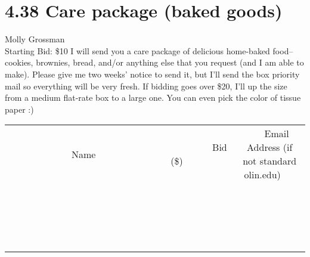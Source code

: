 \documentclass[11pt]{article}
\begin{document}
\section*{4.38 Care package (baked goods)}
Molly Grossman
\\
Starting Bid: \$10
\newline
I will send you a care package of delicious home-baked food--cookies, brownies, bread, and/or anything else that you request (and I am able to make). Please give me two weeks' notice to send it, but I'll send the box priority mail so everything will be very fresh. If bidding goes over \$20, I'll up the size from a medium flat-rate box to a large one. You can even pick the color of tissue paper :)
\\[3ex]
\begin{tabular}{c c c}
~~~~~~~~~~~~~Name~~~~~~~~~~~~~ & ~~~~~~~~~Bid (\$)~~~~~~~~~  & ~~~Email Address (if not standard olin.edu)~~~\\
 & & \\
\hline
 & & \\
\hline
 & & \\
\hline
 & & \\
\hline
 & & \\
\hline
 & & \\
\hline
 & & \\
\hline
 & & \\
\hline
 & & \\
\hline
 & & \\
\hline
 & & \\
\hline
 & & \\
\hline
 & & \\
\hline
 & & \\
\hline
 & & \\
\hline
 & & \\
\hline
 & & \\
\hline
 & & \\
\hline
 & & \\
\hline
\end{tabular}
\newpage
\end{document}
